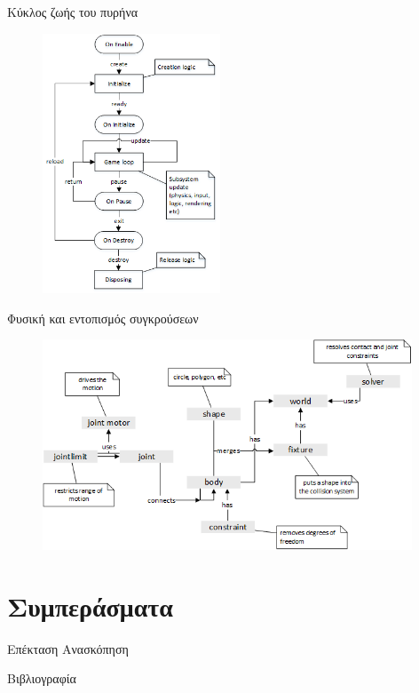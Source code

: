 \documentclass{beamer}
\begin{document}
	\begin{frame}{Κύκλος ζωής του πυρήνα}
		\begin{figure}
			\centering
			\includegraphics[width=53mm]{Images/core_lifecycle}
		\end{figure}	
	\end{frame}

	\begin{frame}{Φυσική και εντοπισμός συγκρούσεων}
		\begin{figure}			
			\centering
			\includegraphics[width=110mm]{Images/physics_engine}
		\end{figure}	
	\end{frame}
			
	\section{Συμπεράσματα}
	\begin{frame}{Επέκταση}
		Ανασκόπηση
	\end{frame}
	
		
	\begin{frame}[allowframebreaks]{Βιβλιογραφία}
		
		 
		
		
	\end{frame}
	
\end{document}
